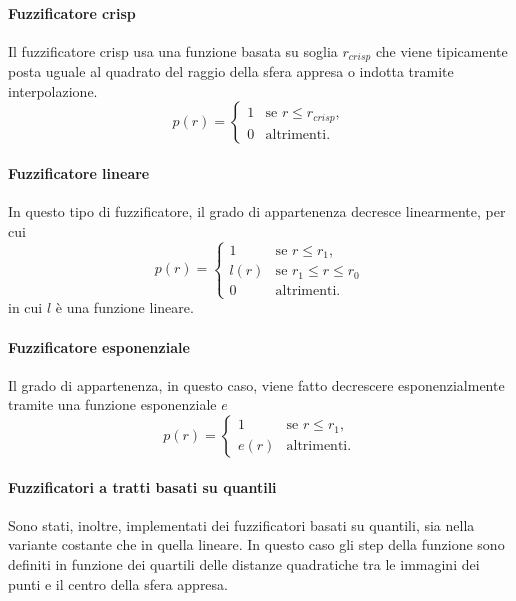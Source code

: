 \documentclass[12pt]{report}
\theoremstyle{definition}
\begin{document}
\paragraph{Fuzzificatore crisp}
Il fuzzificatore crisp usa una funzione basata su soglia $r_{crisp}$ che viene tipicamente posta uguale al quadrato del raggio della sfera appresa o indotta tramite interpolazione.
\begin{equation}
    p(r)= \begin{cases} 1 & \mbox{se } r \leq r_{crisp}, \\ 0 & \mbox{altrimenti.} \end{cases}
\end{equation}

\paragraph{Fuzzificatore lineare}
In questo tipo di fuzzificatore, il grado di appartenenza decresce linearmente, per cui
\begin{equation}
    p(r)= \begin{cases} 1 & \mbox{se } r \leq r_1, \\l(r) & \mbox{se } r_1 \leq r \leq r_0 \\ 0 & \mbox{altrimenti.} \end{cases}
\end{equation}
in cui $l$ è una funzione lineare.

\paragraph{Fuzzificatore esponenziale} Il grado di appartenenza, in questo caso, viene fatto decrescere esponenzialmente tramite una funzione esponenziale $e$
\begin{equation}
    p(r)= \begin{cases} 1 & \mbox{se } r \leq r_1, \\e(r) & \mbox{altrimenti}. \end{cases}
\end{equation}

\paragraph{Fuzzificatori a tratti basati su quantili} Sono stati, inoltre, implementati dei fuzzificatori basati su quantili, sia nella variante costante che in quella lineare.
In questo caso gli step della funzione sono definiti in funzione dei quartili delle distanze quadratiche tra le immagini dei punti e il centro della sfera appresa.
\end{document}
